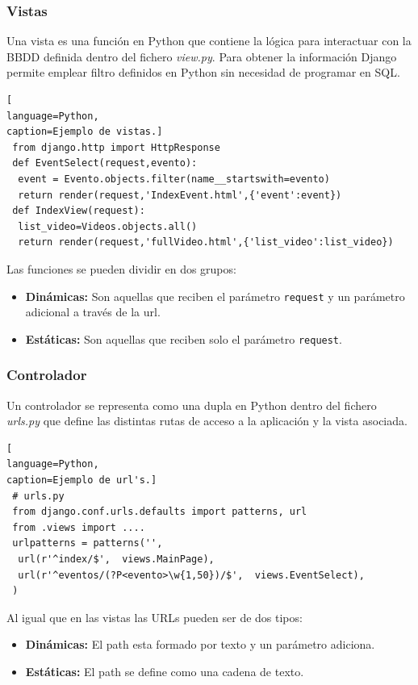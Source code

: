 \subsubsection*{Vistas}
Una vista es una función en Python que contiene la lógica para interactuar con la BBDD definida dentro del fichero \textit{view.py}. Para obtener la información Django permite emplear filtro definidos en Python sin necesidad de programar en SQL.
\begin{lstlisting}[
language=Python,
caption=Ejemplo de vistas.]
 from django.http import HttpResponse 
 def EventSelect(request,evento):
  event = Evento.objects.filter(name__startswith=evento)
  return render(request,'IndexEvent.html',{'event':event})
 def IndexView(request):
  list_video=Videos.objects.all()
  return render(request,'fullVideo.html',{'list_video':list_video})
\end{lstlisting}
Las funciones se pueden dividir en dos grupos:
\begin{itemize}
\item \textbf{Dinámicas:} Son aquellas que reciben el parámetro \texttt{request} y un parámetro adicional a través de la url.
\item \textbf{Estáticas:} Son aquellas que reciben solo el parámetro \texttt{request}.
\end{itemize}
\subsubsection*{Controlador}
Un controlador se representa como una dupla en Python dentro del fichero \textit{urls.py} que define las distintas rutas de acceso a la aplicación y la vista asociada.
\begin{lstlisting}[
language=Python,
caption=Ejemplo de url's.]
 # urls.py 
 from django.conf.urls.defaults import patterns, url
 from .views import ....
 urlpatterns = patterns('',
  url(r'^index/$',  views.MainPage),
  url(r'^eventos/(?P<evento>\w{1,50})/$',  views.EventSelect),
 )
\end{lstlisting}
Al igual que en las vistas las URLs pueden ser de dos tipos:
\begin{itemize}
\item \textbf{Dinámicas:} El path esta formado por texto y un parámetro adiciona.
\item \textbf{Estáticas:} El path se define como una cadena de texto.
\end{itemize}
